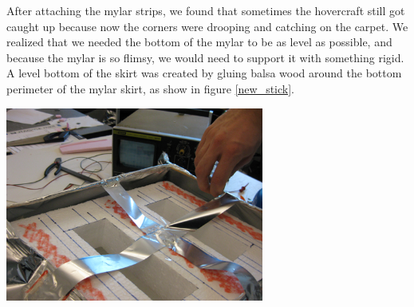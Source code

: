 After attaching the mylar strips, we found that sometimes the hovercraft still got caught up because now the corners 
were drooping and catching on the carpet. We realized that we needed the bottom of the mylar to be as level as possible, 
and because the mylar is so flimsy, we would need to support it with something rigid. A level bottom of the skirt
was created by gluing balsa wood around the bottom perimeter of the mylar skirt, as show in figure \ref{new_stick}.

\begin{center}
  \includegraphics[width=85mm]{imageSources/designProblemsnew_stick.png}
\end{center}
\label{new_stick}
